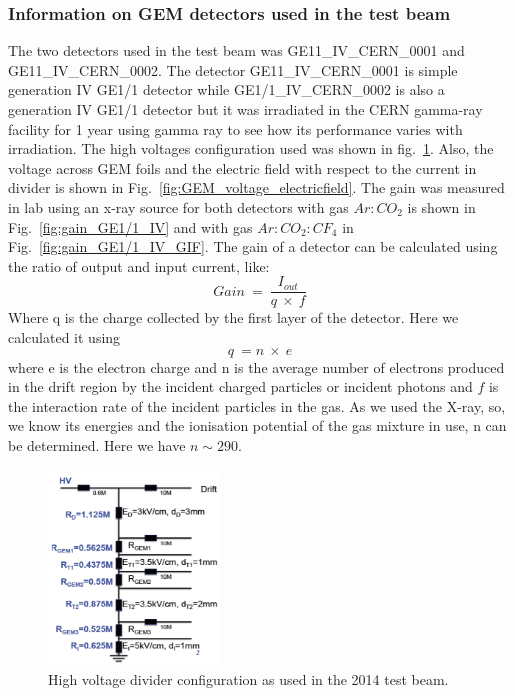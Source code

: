 \subsubsection{Information on GEM detectors used in the test beam} %
\label{ssub:information_of_gem_detectors_used_in_test_beam}
The two detectors used in the test beam was GE11\_IV\_CERN\_0001 and \\GE11\_IV\_CERN\_0002. 
The detector GE11\_IV\_CERN\_0001 is simple generation IV GE1/1 detector while GE1/1\_IV\_CERN\_0002 is also a generation IV GE1/1 detector but it was irradiated in the CERN gamma-ray facility for 1 year using gamma ray to see how its performance varies with irradiation. 
The high voltages configuration used was shown in fig.~\ref{fig:HV_configuration}. 
Also, the voltage across GEM foils and  the electric field  with respect to the current in divider is shown in Fig.~\ref{fig:GEM_voltage_electricfield}. 
The gain was measured in lab using an x-ray source for both detectors with gas $Ar:CO_2$ is shown in Fig.~\ref{fig:gain_GE1/1_IV} and with gas $Ar:CO_2:CF_4$ in Fig.~\ref{fig:gain_GE1/1_IV_GIF}. 
The gain of a detector can be calculated using the ratio of output and input current, like:
\begin{equation}
    Gain~=~\frac{I_{out}}{q~\times~f}
\end{equation}
Where q is the charge collected by the first layer of the detector. Here we calculated it using
\begin{equation}
    q~= n~\times~e
\end{equation}
where e is the electron charge and n is the average number of electrons produced in the drift region by the incident charged particles or incident photons and $f$ is the interaction rate of the incident particles in the gas. As we used the X-ray, so, we know its energies and the ionisation potential of the gas mixture in use, n can be determined. Here we have $n\sim 290$.
\begin{figure}[htbp]
    \centering
    \includegraphics[width=0.40\textwidth]{figures/GEM/HV_divider_gem_testbeam_2014.jpeg}
    \caption{High voltage divider configuration as used in the 2014 test beam.}
    \label{fig:HV_configuration}
\end{figure}
